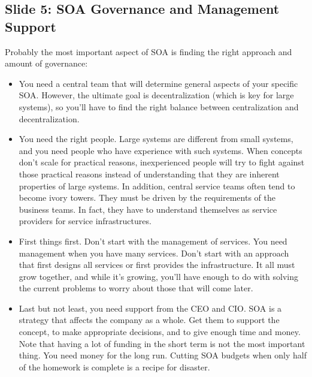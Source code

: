 \documentclass[11pt]{report}
\begin{document}
\subsection{Slide 5: SOA Governance and Management Support}
Probably the most important aspect of SOA is finding the right approach and amount of governance:
\begin{itemize}
	\item You need a central team that will determine general aspects of your specific SOA. However, the ultimate goal is decentralization (which is key for large systems), so you'll have to find the right balance between centralization and decentralization.
	\item You need the right people. Large systems are different from small systems, and you need people who have experience with such systems. When concepts don't scale for practical reasons, inexperienced people will try to fight against those practical reasons instead of understanding that they are inherent properties of large systems. In addition, central service teams often tend to become ivory towers. They must be driven by the requirements of the business teams. In fact, they have to understand themselves as service providers for service infrastructures.
	\item First things first. Don't start with the management of services. You need management when you have many services. Don't start with an approach that first designs all services or first provides the infrastructure. It all must grow together, and while it's growing, you'll have enough to do with solving the current problems to worry about those that will come later.
	\item Last but not least, you need support from the CEO and CIO. SOA is a strategy that affects the company as a whole. Get them to support the concept, to make appropriate decisions, and to give enough time and money. Note that having a lot of funding in the short term is not the most important thing. You need money for the long run. Cutting SOA budgets when only half of the homework is complete is a recipe for disaster.
\end{itemize}
\end{document}
